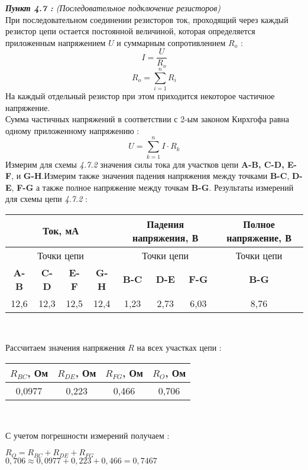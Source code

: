 \documentclass[a4paper,11pt]{article}
\begin{document}
	\begin{flushleft}
	\textit{\textbf{Пункт 4.7 :} (Последовательное подключение резисторов)}
	\\
	\medskip
	\hangindent=1.5cm  \noindent
	При последовательном соединении резисторов ток, проходящий	через каждый резистор цепи остается постоянной величиной, которая определяется приложенным напряжением ${U}$ и суммарным сопротивлением ${R_o}$ :
	\begin{equation}
		I=\frac{U}{R_o}
	\end{equation}
	\begin{equation}
		R_o = \sum_{i=1}^n R_i		
	\end{equation}
	На каждый отдельный резистор при этом приходится некоторое частичное напряжение.\\
	\medskip
		Сумма частичных напряжений в соответствии с 2-ым законом Кирхгофа равна одному приложенному напряжению :
		\begin{equation}
			U = \sum_{k=1}^n I \cdot R_k
		\end{equation}
	Измерим для схемы \textit{4.7.2} значения силы тока	для участков цепи \textbf{A-B, C-D, E-F}, и \textbf{G-H}.Измерим также значения падения напряжения между точками \textbf{B-C}, \textbf{D-E}, \textbf{F-G} а также полное напряжение между точкам \textbf{B-G}.
	\newpage
	Результаты измерений для схемы цепи \textit{4.7.2} :
	\begin{center}
		\begin{tabular}{|c|c|c|c|c|c|c|c|}
\hline 
\multicolumn{4}{|c|}{\textbf{Ток, мА}} & \multicolumn{3}{c|}{\textbf{Падения напряжения, В}} & {\textbf{Полное напряжение, В}}\tabularnewline
\hline 
\multicolumn{4}{|c|}{Точки цепи} & \multicolumn{3}{c|}{Точки цепи} & {Точки цепи}\tabularnewline
\hline 
\textbf{A-B} & \textbf{C-D} & \textbf{E-F} & \textbf{G-H} & \textbf{B-C} & \textbf{D-E} & \textbf{F-G} & \textbf{B-G}\tabularnewline
\hline 
12,6 & 12,3 & 12,5 & 12,4 & 1,23 & 2,73 & 6,03 & 8,76\tabularnewline
\hline 
\end{tabular}
\\
\medskip 	
	\end{center}
	Рассчитаем значения напряжения ${R}$ на всех участках цепи :
	\begin{center}
		\begin{tabular}{|c|c|c|c|}
\hline ${R_{BC}}$,  Ом & ${R_{DE}}$,  Ом & ${R_{FG}}$,  Ом & ${R_O}$,  Ом \\ 
\hline  0,0977 & 0,223 & 0,466 & 0,706 \\ 
\hline 
\end{tabular}
	\\
	\medskip 
	\end{center}
		С учетом погрешности измерений получаем :
	\begin{center}
		${R_O = R_{BC}+R_{DE}+R_{FG}}$\\
		${0,706 \approx 0,0977 + 0,223 + 0,466 = 0,7467}$ 
	\end{center}
	\end{flushleft}
\end{document}
